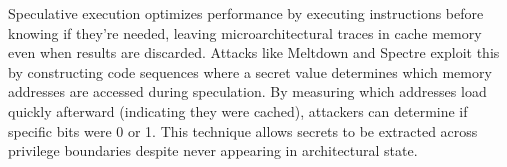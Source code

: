 Speculative execution optimizes performance by executing instructions before knowing if they're needed, leaving microarchitectural traces in cache memory even when results are discarded. Attacks like Meltdown and Spectre exploit this by constructing code sequences where a secret value determines which memory addresses are accessed during speculation. By measuring which addresses load quickly afterward (indicating they were cached), attackers can determine if specific bits were 0 or 1. This technique allows secrets to be extracted across privilege boundaries despite never appearing in architectural state.
